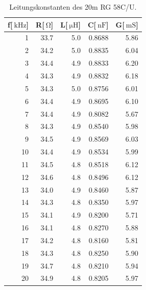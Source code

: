 \begin{table}
\centering
	\caption[]{Leitungskonstanten des 20m RG 58C/U.}
	\begin{tabular}{r r r r r}
		f[$\SI{}{\kilo\hertz}$] & R[$\SI{}{\ohm}$] & L[$\SI{}{\micro\henry}$] & C[$\SI{}{\nano \farad}$] & G[$\SI{}{\milli\siemens}$]\\
		\hline \hline
			  1	 &	33.7	&	5.0	&	0.8688	&	5.86\\
			  2	 &	34.2	&	5.0	&	0.8835	&	6.04\\
			  3	 &	34.4	&	4.9	&	0.8833	&	6.20\\
			  4	 &	34.3	&	4.9	&	0.8832	&	6.18\\
			  5	 &	34.3	&	5.0	&	0.8756	&	6.01\\
			  6	 &	34.4	&	4.9	&	0.8695	&	6.10\\
			  7	 &	34.4	&	4.9	&	0.8082	&	5.67\\
			  8	 &	34.3	&	4.9	&	0.8540	&	5.98\\
			  9	 &	34.5	&	4.9	&	0.8569	&	6.03\\
			 10  &	34.4	&	4.9	&	0.8534	&	5.99\\
			 11	 &	34.5	&	4.8	&	0.8518	&	6.12\\
			 12	 &	34.6	&	4.8	&	0.8496	&	6.12\\
			 13	 &	34.0	&	4.9	&	0.8460	&	5.87\\
			 14	 &	34.3	&	4.8	&	0.8350	&	5.97\\
			 15	 &	34.1	&	4.9	&	0.8200	&	5.71\\
			 16	 &	34.1	&	4.8	&	0.8270	&	5.88\\
			 17	 &	34.2	&	4.8	&	0.8160	&	5.81\\
			 18	 &	34.3	&	4.8	&	0.8250	&	5.90\\
			 19	 &	34.7	&	4.8	&	0.8210	&	5.94\\
			 20	 &	34.9	&	4.8	&	0.8205	&	5.97\\
			\hline
	\end{tabular}
	\label{tab_konst2}
\end{table}

